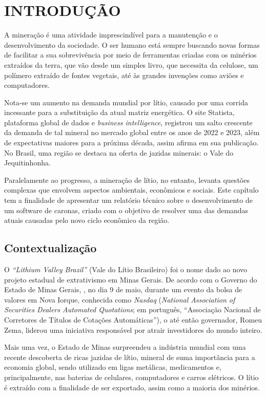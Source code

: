 \chapter{INTRODUÇÃO}

A mineração é uma atividade imprescindível para a manutenção e o desenvolvimento da sociedade. O ser humano está sempre buscando novas formas de facilitar a sua sobrevivência por meio de ferramentas criadas com os minérios extraídos da terra, que vão desde um simples livro, que necessita da celulose, um polímero extraído de fontes vegetais, até às grandes invenções como aviões e computadores.

Nota-se um aumento na demanda mundial por lítio, causado por uma corrida incessante para a substituição da atual matriz energética. O site Statista, plataforma global de dados e \textit{business intelligence}, registrou um salto crescente da demanda de tal mineral no mercado global entre os anos de 2022 e 2023, além de expectativas maiores para a próxima década, assim afirma  em sua publicação. No Brasil, uma região se destaca na oferta de jazidas minerais: o Vale do Jequitinhonha.

Paralelamente ao progresso, a mineração de lítio, no entanto, levanta questões complexas que envolvem aspectos ambientais, econômicos e sociais. Este capítulo tem a finalidade de apresentar um relatório técnico sobre o desenvolvimento de um software de caronas, criado com o objetivo de resolver uma das demandas atuais causadas pelo novo ciclo econômico da região.



\section{Contextualização}

O \textit{“Lithium Valley Brazil”} (Vale do Lítio Brasileiro) foi o nome dado ao novo projeto estadual de extrativismo em Minas Gerais. De acordo com o Governo do Estado de Minas Gerais, , no dia 9 de maio, durante um evento da bolsa de valores em Nova Iorque, conhecida como \textit{Nasdaq} (\textit{National Association of Securities Dealers Automated Quotations}; em português, ``Associação Nacional de Corretores de Títulos de Cotações Automáticas''), o até então governador, Romeu Zema, liderou uma iniciativa responsável por atrair investidores do mundo inteiro. 

Mais uma vez, o Estado de Minas surpreendeu a indústria mundial com uma recente descoberta de ricas jazidas de lítio, mineral de suma importância para a economia global, sendo utilizado em ligas metálicas, medicamentos e, principalmente, nas baterias de celulares, computadores e carros elétricos. O lítio é extraído com a finalidade de ser exportado, assim como a maioria dos minérios.


